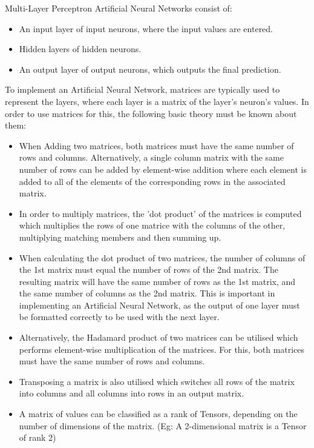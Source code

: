 \documentclass[./project-report/src/latex/project-report.tex]{subfiles}
\begin{document}
\vspace{5mm}

\noindent
Multi-Layer Perceptron Artificial Neural Networks consist of:

\begin{itemize}
    \item An input layer of input neurons, where the input values are entered.
    \item Hidden layers of hidden neurons.
    \item An output layer of output neurons, which outputs the final prediction.
\end{itemize}

To implement an Artificial Neural Network, matrices are typically used to represent the layers, where each layer is a matrix of the layer's neuron's values. In 
order to use matrices for this, the following basic theory must be known about them:

\begin{itemize}
    \item When Adding two matrices, both matrices must have the same number of rows and columns. Alternatively, a single column matrix with the same number of rows can be 
          added by element-wise addition where each element is added to all of the elements of the corresponding rows in the associated matrix.
    \item In order to multiply matrices, the 'dot product' of the matrices is computed which multiplies the rows of one matrice with the columns of the other, multiplying 
          matching members and then summing up.
    \item When calculating the dot product of two matrices, the number of columns of the 1st matrix must equal the number of rows of the 2nd matrix. The resulting matrix will 
          have the same number of rows as the 1st matrix, and the same number of columns as the 2nd matrix. This is important in implementing an Artificial Neural Network, 
          as the output of one layer must be formatted correctly to be used with the next layer.
    \item Alternatively, the Hadamard product of two matrices can be utilised which performs element-wise multiplication of the matrices. For this, both matrices 
          must have the same number of rows and columns.
    \item Transposing a matrix is also utilised which switches all rows of the matrix into columns and all columns into rows in an output matrix.
    \item A matrix of values can be classified as a rank of Tensors, depending on the number of dimensions of the matrix. (Eg: A 2-dimensional matrix is a Tensor of 
          rank 2)
\end{itemize}
\end{document}
